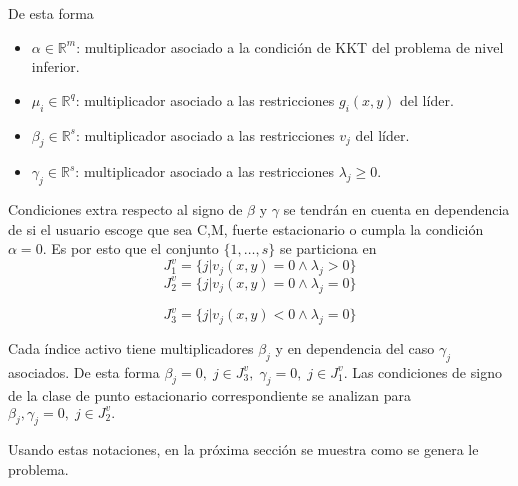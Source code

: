 De esta forma  
\begin{itemize}\item$ \alpha\in \mathbb{R}^m  $: multiplicador asociado a la condici\'on de KKT del problema de nivel inferior.                                                                                                     
       \item  $\mu_i \in \mathbb{R}^q$:  multiplicador asociado a las restricciones  $g_i(x,y)$ del líder.  \item        $ \beta_j\in \mathbb{R}^s  $:              multiplicador asociado  a las restricciones   $v_{j}$ del líder.          
   \item        $\gamma_j\in \mathbb{R}^s$:            multiplicador asociado a las  restricciones  $\lambda_j \geq 0$.\end{itemize}



Condiciones extra respecto al signo de $\beta$ y $\gamma$ se tendr\'an en cuenta en dependencia de si el usuario escoge que sea  C,M, fuerte estacionario o cumpla  la condici\'on $\alpha=0$.  Es por esto que el conjunto $\{1,\ldots, s\}$  se particiona en 
 \begin{equation} \label{J_pos_lambda_0_level_inferior}
                        J_1^v=\{j | v_j(x,y)=0 \land \lambda_j>0 \} %
                        \end{equation} 
                     \begin{equation}
                        J_2^v=\{j | v_j(x,y)=0 \land \lambda_j=0 \}
                        \label{J_0_lambda_pos_level_inferior}
                    \end{equation}
                  
 \begin{equation}
                        J_3^v=\{j | v_j(x,y)< 0 \land \lambda_j=0 \}
                        \label{J_neg_lambda_0_level_inferior}
                    \end{equation}
            
    
Cada índice activo tiene multiplicadores $\beta_j$ y en dependencia del caso $\gamma_j$ asociados. De esta forma 
$\beta_j= 0,\; j\in  J_3^v,\; \gamma_j= 0,\; j\in J_1^v.$  Las condiciones de signo de la clase de punto estacionario correspondiente se analizan para $\beta_j, \gamma_j= 0,\; j\in J_2^v.$
       

Usando estas notaciones, en la pr\'oxima secci\'on se muestra como se genera le problema.



